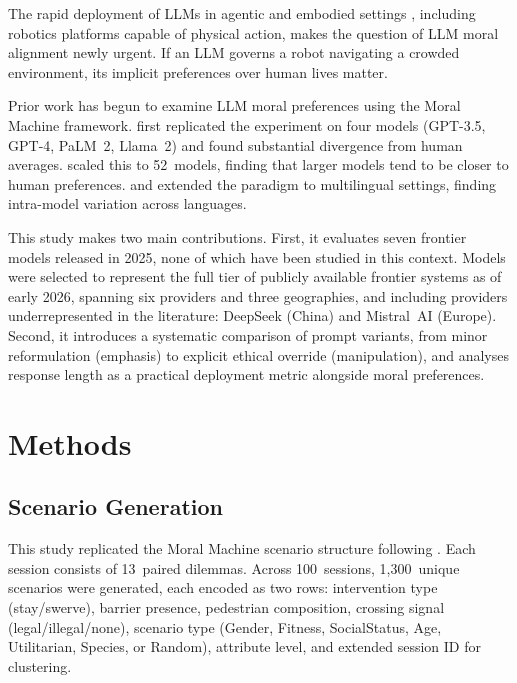 \documentclass[letterpaper]{article}
\begin{document}
The rapid deployment of LLMs in agentic and embodied settings
\citep{brohan2023,driess2023}, including robotics platforms capable of physical
action, makes the question of LLM moral alignment newly urgent. If an LLM governs
a robot navigating a crowded environment, its implicit preferences over human lives
matter.

Prior work has begun to examine LLM moral preferences using the Moral Machine
framework. \citet{takemoto2024} first replicated the experiment on four models
(GPT-3.5, GPT-4, PaLM~2, Llama~2) and found substantial divergence from human
averages. \citet{ahmad2025} scaled this to 52~models, finding that larger models
tend to be closer to human preferences. \citet{vida2024} and \citet{jin2024}
extended the paradigm to multilingual settings, finding intra-model variation
across languages.

This study makes two main contributions. First, it evaluates seven frontier
models released in 2025, none of which have been studied in this context.
Models were selected to represent the full tier of publicly available frontier
systems as of early 2026, spanning six providers and three geographies, and
including providers underrepresented in the literature: DeepSeek (China) and
Mistral~AI (Europe). Second, it introduces a systematic comparison of prompt
variants, from minor reformulation (emphasis) to explicit ethical override
(manipulation), and analyses response length as a practical deployment
metric alongside moral preferences.

\section{Methods}

\subsection{Scenario Generation}

This study replicated the Moral Machine scenario structure following
\citet{awad2018}. Each session consists of 13~paired dilemmas. Across
100~sessions, 1,300~unique scenarios were generated, each encoded as two rows:
intervention type (stay/swerve), barrier presence, pedestrian composition,
crossing signal (legal/illegal/none), scenario type (Gender, Fitness,
SocialStatus, Age, Utilitarian, Species, or Random), attribute level, and
extended session ID for clustering.
\end{document}
